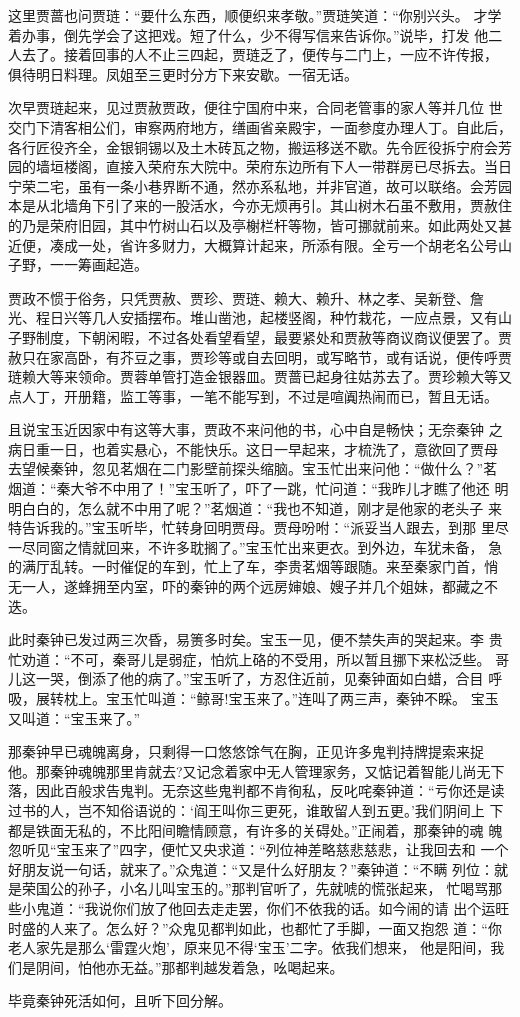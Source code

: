 这里贾蔷也问贾琏：“要什么东西，顺便织来孝敬。”贾琏笑道：“你别兴头。
才学着办事，倒先学会了这把戏。短了什么，少不得写信来告诉你。”说毕，打发
他二人去了。接着回事的人不止三四起，贾琏乏了，便传与二门上，一应不许传报，
俱待明日料理。凤姐至三更时分方下来安歇。一宿无话。

次早贾琏起来，见过贾赦贾政，便往宁国府中来，合同老管事的家人等并几位
世交门下清客相公们，审察两府地方，缮画省亲殿宇，一面参度办理人丁。自此后，
各行匠役齐全，金银铜锡以及土木砖瓦之物，搬运移送不歇。先令匠役拆宁府会芳
园的墙垣楼阁，直接入荣府东大院中。荣府东边所有下人一带群房已尽拆去。当日
宁荣二宅，虽有一条小巷界断不通，然亦系私地，并非官道，故可以联络。会芳园
本是从北墙角下引了来的一股活水，今亦无烦再引。其山树木石虽不敷用，贾赦住
的乃是荣府旧园，其中竹树山石以及亭榭栏杆等物，皆可挪就前来。如此两处又甚
近便，凑成一处，省许多财力，大概算计起来，所添有限。全亏一个胡老名公号山
子野，一一筹画起造。

贾政不惯于俗务，只凭贾赦、贾珍、贾琏、赖大、赖升、林之孝、吴新登、詹
光、程日兴等几人安插摆布。堆山凿池，起楼竖阁，种竹栽花，一应点景，又有山
子野制度，下朝闲暇，不过各处看望看望，最要紧处和贾赦等商议商议便罢了。贾
赦只在家高卧，有芥豆之事，贾珍等或自去回明，或写略节，或有话说，便传呼贾
琏赖大等来领命。贾蓉单管打造金银器皿。贾蔷已起身往姑苏去了。贾珍赖大等又
点人丁，开册籍，监工等事，一笔不能写到，不过是喧阗热闹而已，暂且无话。

且说宝玉近因家中有这等大事，贾政不来问他的书，心中自是畅快；无奈秦钟
之病日重一日，也着实悬心，不能快乐。这日一早起来，才梳洗了，意欲回了贾母
去望候秦钟，忽见茗烟在二门影壁前探头缩脑。宝玉忙出来问他：“做什么？”茗
烟道：“秦大爷不中用了！”宝玉听了，吓了一跳，忙问道：“我昨儿才瞧了他还
明明白白的，怎么就不中用了呢？”茗烟道：“我也不知道，刚才是他家的老头子
来特告诉我的。”宝玉听毕，忙转身回明贾母。贾母吩咐：“派妥当人跟去，到那
里尽一尽同窗之情就回来，不许多耽搁了。”宝玉忙出来更衣。到外边，车犹未备，
急的满厅乱转。一时催促的车到，忙上了车，李贵茗烟等跟随。来至秦家门首，悄
无一人，遂蜂拥至内室，吓的秦钟的两个远房婶娘、嫂子并几个姐妹，都藏之不迭。

此时秦钟已发过两三次昏，易箦多时矣。宝玉一见，便不禁失声的哭起来。李
贵忙劝道：“不可，秦哥儿是弱症，怕炕上硌的不受用，所以暂且挪下来松泛些。
哥儿这一哭，倒添了他的病了。”宝玉听了，方忍住近前，见秦钟面如白蜡，合目
呼吸，展转枕上。宝玉忙叫道：“鲸哥!宝玉来了。”连叫了两三声，秦钟不睬。
宝玉又叫道：“宝玉来了。”

那秦钟早已魂魄离身，只剩得一口悠悠馀气在胸，正见许多鬼判持牌提索来捉
他。那秦钟魂魄那里肯就去?又记念着家中无人管理家务，又惦记着智能儿尚无下
落，因此百般求告鬼判。无奈这些鬼判都不肯徇私，反叱咤秦钟道：“亏你还是读
过书的人，岂不知俗语说的：‘阎王叫你三更死，谁敢留人到五更。’我们阴间上
下都是铁面无私的，不比阳间瞻情顾意，有许多的关碍处。”正闹着，那秦钟的魂
魄忽听见“宝玉来了”四字，便忙又央求道：“列位神差略慈悲慈悲，让我回去和
一个好朋友说一句话，就来了。”众鬼道：“又是什么好朋友？”秦钟道：“不瞒
列位：就是荣国公的孙子，小名儿叫宝玉的。”那判官听了，先就唬的慌张起来，
忙喝骂那些小鬼道：“我说你们放了他回去走走罢，你们不依我的话。如今闹的请
出个运旺时盛的人来了。怎么好？”众鬼见都判如此，也都忙了手脚，一面又抱怨
道：“你老人家先是那么‘雷霆火炮’，原来见不得‘宝玉’二字。依我们想来，
他是阳间，我们是阴间，怕他亦无益。”那都判越发着急，吆喝起来。

毕竟秦钟死活如何，且听下回分解。